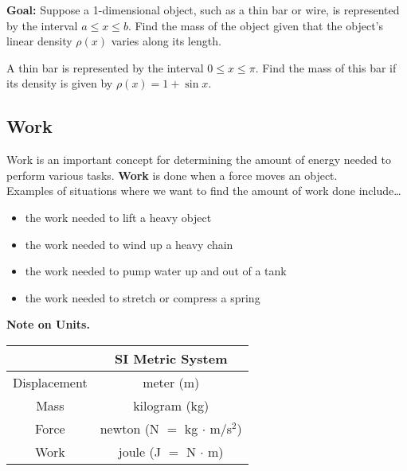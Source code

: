 \documentclass[12pt]{article}
\begin{document}
\textbf{Goal:} Suppose a 1-dimensional object, such as a thin bar or wire, is represented by the interval $a\leq x\leq b$. Find the mass of the object given that the object's linear density $\rho(x)$ varies along its length.

\newpage

\Example A thin bar is represented by the interval $0\leq x\leq\pi$. Find the mass of this bar if its density is given by $\rho(x)=1+\sin x$.

\vfill

\subsection*{Work}

Work is an important concept for determining the amount of energy needed to perform various tasks. \textbf{Work} is done when a force moves an object.\\

Examples of situations where we want to find the amount of work done include\dots
\begin{itemize}
\item the work needed to lift a heavy object
\item the work needed to wind up a heavy chain
\item the work needed to pump water up and out of a tank
\item the work needed to stretch or compress a spring
\end{itemize}


\newpage

\textbf{Note on Units.}
\begin{center}
\begin{tabular}{|c|c|}
\hline
 & \textbf{SI Metric System} \\
\hline
Displacement & meter (m) \\
\hline
Mass & kilogram (kg) \\
\hline
Force & newton (N $=$ kg $\cdot$ m/s$^2$)\\
\hline
Work & joule (J $=$ N $\cdot$ m)\\
\hline
\end{tabular}
\end{center}
\end{document}
